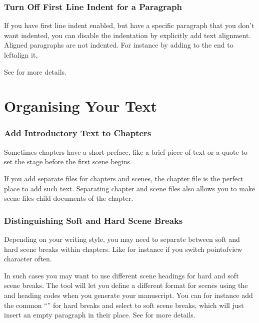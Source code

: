 \documentclass[a4paper,11pt,english]{sphinxmanual}
\begin{document}
\subsubsection*{Turn Off First Line Indent for a Paragraph}

\sphinxAtStartPar
If you have first line indent enabled, but have a specific paragraph that you don’t want
indented, you can disable the indentation by explicitly add text alignment. Aligned paragraphs
are not indented. For instance by adding \sphinxcode{\sphinxupquote{\textless{}\textless{}}} to the end to left\sphinxhyphen{}align it,

\sphinxAtStartPar
See {\hyperref[\detokenize{usage_format:a-fmt-align}]{}} for more details.


\section{Organising Your Text}
\label{\detokenize{int_howto:organising-your-text}}\subsubsection*{Add Introductory Text to Chapters}

\sphinxAtStartPar
Sometimes chapters have a short preface, like a brief piece of text or a quote to set the stage
before the first scene begins.

\sphinxAtStartPar
If you add separate files for chapters and scenes, the chapter file is the perfect place to add
such text. Separating chapter and scene files also allows you to make scene files child
documents of the chapter.
\subsubsection*{Distinguishing Soft and Hard Scene Breaks}

\sphinxAtStartPar
Depending on your writing style, you may need to separate between soft and hard scene breaks
within chapters. Like for instance if you switch point\sphinxhyphen{}of\sphinxhyphen{}view character often.

\sphinxAtStartPar
In such cases you may want to use different scene headings for hard and soft scene breaks. The
 tool will let you define a different format for scenes using the \sphinxcode{\sphinxupquote{\#\#\#}}
and \sphinxcode{\sphinxupquote{\#\#\#!}} heading codes when you generate your manuscript. You can for instance add the
common “\sphinxcode{\sphinxupquote{* * *}}” for hard breaks and select to soft scene breaks, which will just insert an
empty paragraph in their place. See {\hyperref[\detokenize{project_manuscript:a-manuscript-settings}]{}} for more details.
\end{document}
